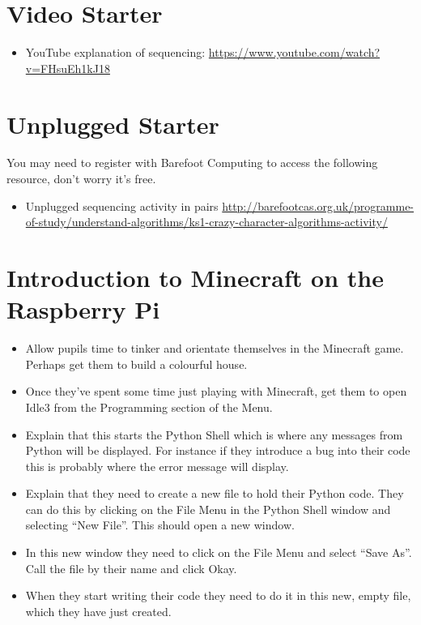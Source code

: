 \documentclass{geocraft-lesson-plan}
\begin{document}
\section*{Video Starter}
\begin{itemize}
\item YouTube explanation of sequencing: 
  {\textcolor{greenish}
    {\url{https://www.youtube.com/watch?v=FHsuEh1kJ18}}}
\end{itemize}

\section*{Unplugged Starter} You may need to register with Barefoot Computing to access the following resource, don't
worry it's free.
\begin{itemize}
\item Unplugged sequencing activity in pairs  
  {\textcolor{greenish}
    {\url{http://barefootcas.org.uk/programme-of-study/understand-algorithms/ks1-crazy-character-algorithms-activity/}}} 
\end{itemize}

\section*{Introduction to Minecraft on the Raspberry Pi}
\begin{itemize}
\item Allow pupils time to tinker and orientate themselves in the Minecraft game. Perhaps get them to build a colourful house. 
\item Once they've spent some time just playing with Minecraft, get them to open Idle3 from the Programming section of
  the Menu.
\item Explain that this starts the Python Shell which is where any messages from Python will be displayed. For instance
  if they introduce a bug into their code this is probably where the error message will display.
\item Explain that they need to create a new file to hold their Python code. They can do this by clicking on the File
  Menu in the Python Shell window and selecting ``New File''. This should open a new window. 
\item In this new window they need to click on the File Menu and select ``Save As''. Call the file by their name and
  click Okay.
\item When they start writing their code they need to do it in this new, empty file, which they have just created.
\end{itemize}
\end{document}
